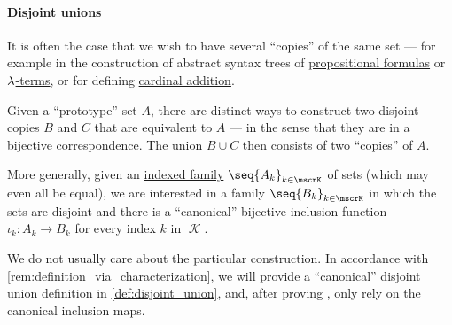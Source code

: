 \paragraph{Disjoint unions}

\begin{remark}\label{rem:disjoint_unions}
  It is often the case that we wish to have several \enquote{copies} of the same set --- for example in the construction of abstract syntax trees of \hyperref[def:propositional_formula_ast]{propositional formulas} or \hyperref[def:lambda_term_ast]{\( {\mathrm \lambda} \)-terms}, or for defining \hyperref[def:cardinal_arithmetic/addition]{cardinal addition}.

  Given a \enquote{prototype} set \( A \), there are distinct ways to construct two disjoint copies \( B \) and \( C \) that are equivalent to \( A \) --- in the sense that they are in a bijective correspondence. The union \( B \cup C \) then consists of two \enquote{copies} of \( A \).

  More generally, given an \hyperref[def:indexed_family]{indexed family} \( \seq{ A_k }_{k \in \mscrK} \) of sets (which may even all be equal), we are interested in a family \( \seq{ B_k }_{k \in \mscrK} \) in which the sets are disjoint and there is a \enquote{canonical} bijective inclusion function \( \iota_k: A_k \to B_k \) for every index \( k \) in \( \mscrK \).

  We do not usually care about the particular construction. In accordance with \cref{rem:definition_via_characterization}, we will provide a \enquote{canonical} disjoint union definition in \cref{def:disjoint_union}, and, after proving , only rely on the canonical inclusion maps.
\end{remark}

